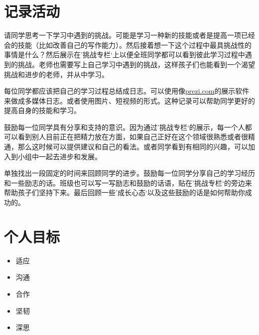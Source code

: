 \section{记录活动}
     请同学思考一下学习中遇到的挑战。可能是学习一种新的技能或者是提高一项已经会的技能（比如改善自己的写作能力）。然后接着想一下这个过程中最具挑战性的事情是什么？然后展示在’挑战专栏‘上以便全班同学都可以看到彼此学习过程中遇到的挑战。老师也需要写上自己学习中遇到的挑战，这样孩子们也能看到一个渴望挑战和进步的老师，并从中学习。\par
     每位同学都应该把自己的学习过程总结成日志。可以使用像\href{file:///D:/storage/members/temp/(www.prezi. com}{prezi.com}的展示软件来做成多媒体日志。或者使用图片、短视频的形式。这种记录可以帮助同学更好的提高自身的技能和学习。\par
     鼓励每一位同学具有分享和支持的意识。因为通过’挑战专栏‘的展示，每一个人都可以看到别人目前正在把精力放在方面，如果自己正好在这个领域很熟悉或者很精通，那么这时候可以提供建议和自己的看法。或者同学看到有相同的兴趣，可以加入到小组中一起去进步和发展。\par
     单独找出一段固定的时间来回顾同学的进步。鼓励每一位同学分享自己的学习经历和一些励志的话。班级也可以写一写励志和鼓励的话语，贴在’挑战专栏‘的旁边来帮助孩子们坚持下来。最后回顾一些’成长心态‘以及这些鼓励的话是如何帮助你成功的。


\section{个人目标}
  

   \begin{itemize}
     \item 适应
     \item 沟通
     \item 合作 
     \item 坚韧
     \item 深思 
   \end{itemize}
